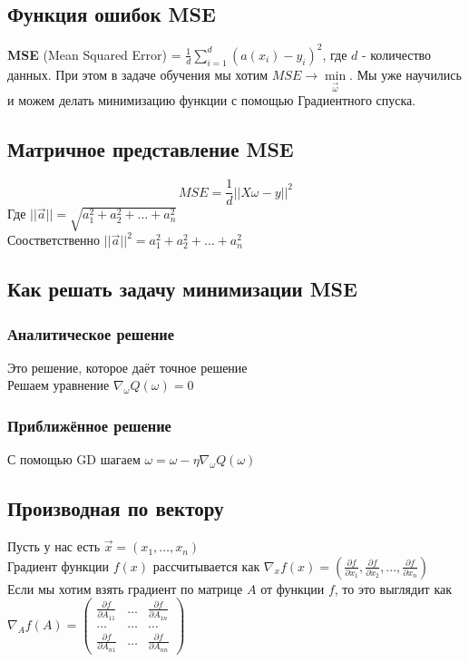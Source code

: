 \documentclass{article}
\theoremstyle{problemstyle}
\theoremstyle{ans}
\begin{document}
\subsection{Функция ошибок MSE}
\textbf{MSE} (Mean Squared Error) = $\frac{1}{d}\sum\limits_{i=1}^{d} (a(x_i) - y_i)^2$, где $d$ - количество данных. При этом в задаче обучения мы хотим $MSE \to \min\limits_{\overrightarrow\omega}$. Мы уже научились и  можем делать минимизацию функции с помощью Градиентного спуска.\\

\subsection{Матричное представление MSE}
$$MSE = \frac{1}{d}||X \omega-y||^2$$
Где $||\overrightarrow{a}|| = \sqrt{a_1^2 + a_2^2 + \dots + a_n^2}$\\
Соостветственно $||\overrightarrow{a}||^2 = a_1^2 + a_2^2 + \dots + a_n^2$

\subsection{Как решать задачу минимизации MSE}
\subsubsection{Аналитическое решение}
Это решение, которое даёт точное решение\\
Решаем уравнение $\nabla_\omega Q(\omega) = 0$

\subsubsection{Приближённое решение}
С помощью GD шагаем $\omega = \omega - \eta \nabla_\omega Q(\omega)$


\subsection{Производная по вектору}
Пусть у нас есть $\overrightarrow{x} = (x_1, \dots, x_n)$\\
Градиент функции $f(x)$ рассчитывается как $\nabla_x f(x) = (\frac{\partial f}{\partial x_1}, \frac{\partial f}{\partial x_2}, \dots, \frac{\partial f}{\partial x_n})$\\
Если мы хотим взять градиент по матрице $A$ от функции $f$, то это выглядит как $\nabla_A f(A) = \begin{pmatrix}
\frac{\partial f}{\partial A_{11}} & \dots & \frac{\partial f}{\partial A_{1n}}\\
\dots & \dots & \dots\\
\frac{\partial f}{\partial A_{n1}} & \dots &  \frac{\partial f}{\partial A_{nn}}
\end{pmatrix}
$
\end{document}

